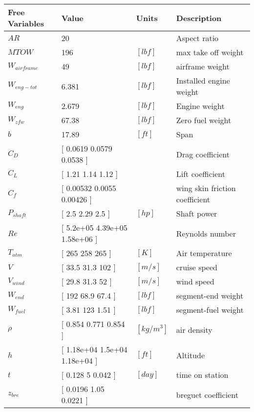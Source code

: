 
{\footnotesize
\begin{longtable}{llll}
\toprule
Free Variables & Value & Units & Description \\
\midrule
$AR$ & 20 & $ $ & Aspect ratio \\
$MTOW$ & 196 & $  [lbf] $ & max take off weight \\
$W_{airframe}$ & 49 & $  [lbf] $ & airframe weight \\
$W_{eng-tot}$ & 6.381 & $  [lbf] $ & Installed engine weight \\
$W_{eng}$ & 2.679 & $  [lbf] $ & Engine weight \\
$W_{zfw}$ & 67.38 & $  [lbf] $ & Zero fuel weight \\
$b$ & 17.89 & $  [ft] $ & Span \\
$C_D$ & [ 0.0619    0.0579    0.0538   ] & $ $ & Drag coefficient \\
$C_L$ & [ 1.21      1.14      1.12     ] & $ $ & Lift coefficient \\
$C_f$ & [ 0.00532   0.0055    0.00426  ] & $ $ & wing skin friction coefficient \\
$P_{shaft}$ & [ 2.5       2.29      2.5      ] & $  [hp] $ & Shaft power \\
$Re$ & [ 5.2e+05   4.39e+05  1.58e+06 ] & $ $ & Reynolds number \\
$T_{atm}$ & [ 265       258       265      ] & $  [K] $ & Air temperature \\
$V$ & [ 33.5      31.3      102      ] & $  [m/s] $ & cruise speed \\
$V_{wind}$ & [ 29.8      31.3      52       ] & $  [m/s] $ & wind speed \\
$W_{end}$ & [ 192       68.9      67.4     ] & $  [lbf] $ & segment-end weight \\
$W_{fuel}$ & [ 3.81      123       1.51     ] & $  [lbf] $ & segment-fuel weight \\
$\rho$ & [ 0.854     0.771     0.854    ] & $  [kg/m^3] $ & air density \\
$h$ & [ 1.18e+04  1.5e+04   1.18e+04 ] & $  [ft] $ & Altitude \\
$t$ & [ 0.128     5         0.042    ] & $  [day] $ & time on station \\
$z_{bre}$ & [ 0.0196    1.05      0.0221   ] & $ $ & breguet coefficient \\
\bottomrule
\end{longtable}}

